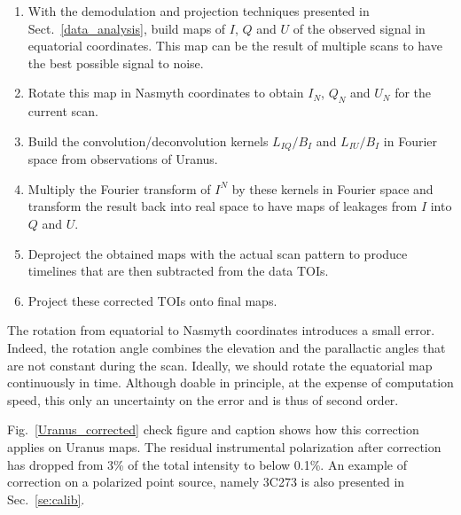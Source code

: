 \documentclass[twocolumn,traditabstract]{aa}
\begin{document}
{\begin{enumerate}
\item With the demodulation and projection techniques presented in
  Sect.~\ref{data_analysis}, build maps of $I$, $Q$ and $U$ of the observed
  signal in equatorial coordinates. This map can be the result of multiple scans to have
  the best possible signal to noise.
\item Rotate this map in Nasmyth coordinates to obtain $I_N$, $Q_N$ and $U_N$
  for the current scan.
\item Build the convolution/deconvolution kernels $L_{IQ}/B_I$ and $L_{IU}/B_I$
  in Fourier space from observations of Uranus.
\item Multiply the Fourier transform of $I^N$ by these kernels in Fourier space
  and transform the result back into real space to have maps of leakages from
  $I$ into $Q$ and $U$.
\item Deproject the obtained maps with the actual scan pattern to produce
  timelines that are then subtracted from the data TOIs.
\item Project these corrected TOIs onto final maps.
\end{enumerate}

The rotation from equatorial to Nasmyth coordinates introduces a small
error. Indeed, the rotation angle combines the elevation and the parallactic
angles that are not constant during the scan. Ideally, we should rotate the
equatorial map continuously in time. Although doable in principle, at the
expense of computation speed, this only an uncertainty on the error and is thus
of second order.




Fig.~\ref{Uranus_corrected} {\color{red} check figure and caption} shows how
this correction applies on Uranus maps. The residual instrumental polarization
after correction has dropped from 3\% of the total intensity to below 0.1\%. An
example of correction on a polarized point source, namely 3C273 is also
presented in Sec.~\ref{se:calib}.

}
\end{document}
